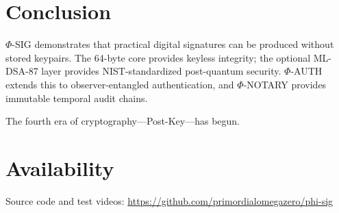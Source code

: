 \documentclass{article}
\begin{document}
\section{Conclusion}

$\Phi$-SIG demonstrates that practical digital signatures can be produced without stored keypairs. The 64-byte core provides keyless integrity; the optional ML-DSA-87 layer provides NIST-standardized post-quantum security. $\Phi$-AUTH extends this to observer-entangled authentication, and $\Phi$-NOTARY provides immutable temporal audit chains.

The fourth era of cryptography—Post-Key—has begun.

\section*{Availability}

Source code and test videos: \url{https://github.com/primordialomegazero/phi-sig}
\end{document}
